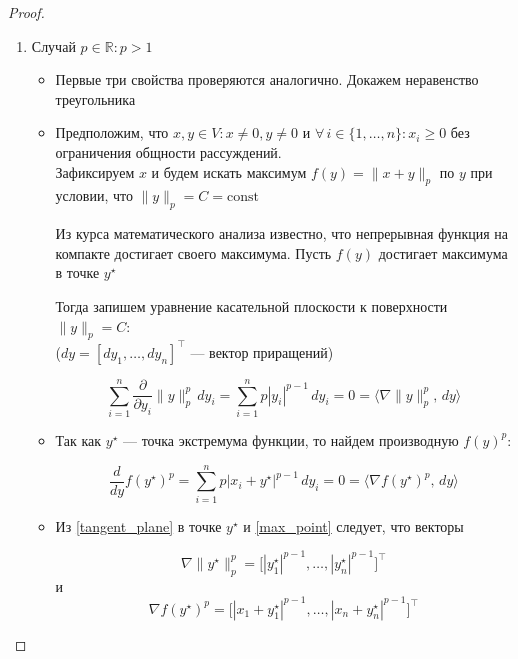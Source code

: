 \begin{proof}
\begin{enumerate}
        \item Случай $p \in \mathbb{R}: p > 1$

            \begin{itemize}
                \item Первые три свойства проверяются аналогично. Докажем неравенство треугольника

                \item Предположим, что $x, y \in V: x \neq 0, y \neq 0$ и $\forall \, i \in \{1, \ldots, n\}: x_i \geqslant 0$ без ограничения общности рассуждений. \\ Зафиксируем $x$ и будем искать максимум $f(y) = \lVert x + y \rVert_p$ по $y$ при условии, что $\lVert y \rVert_p = C = \mathrm{const}$

                Из курса математического анализа известно, что непрерывная функция на компакте достигает своего максимума. Пусть $f(y)$ достигает максимума в точке $y^{\star}$

                Тогда запишем уравнение касательной плоскости к поверхности $\lVert y \rVert_p = C$: \\($dy = [dy_1, \ldots, dy_n]^{\top}$ --- вектор приращений)

                \begin{equation}\label{tangent_plane}
                \sum\limits_{i = 1}^n \frac{\partial}{\partial y_i} \lVert y \rVert_p^p \, dy_i = \sum\limits_{i = 1}^n p |y_i|^{p - 1} \, dy_i = 0 = \Big\langle \nabla \lVert y \rVert_p^p, \, dy \Big\rangle
                \end{equation}

                \item Так как $y^{\star}$ --- точка экстремума функции, то найдем производную $f(y)^p$:

                \begin{equation}\label{max_point}
                \frac{d}{dy}f(y^{\star})^p = \sum\limits_{i = 1}^{n} p |x_i + y^{\star}|^{p - 1} \, dy_i = 0 = \Big\langle \nabla f(y^{\star})^p, \, dy \Big\rangle
                \end{equation}

                \item Из \eqref{tangent_plane} в точке $y^{\star}$ и \eqref{max_point} следует, что векторы

                \[\nabla \lVert y^{\star} \rVert_p^p = \Big[|y^{\star}_1|^{p-1}, \ldots, |y^{\star}_n|^{p-1}\Big]^{\top}
                \]
                и
                \[\nabla f(y^{\star})^p = \Big[|x_1 + y^{\star}_1|^{p-1}, \ldots, |x_n + y^{\star}_n|^{p-1}\Big]^{\top}
                \]


\end{itemize}
\end{enumerate}
\end{proof}
